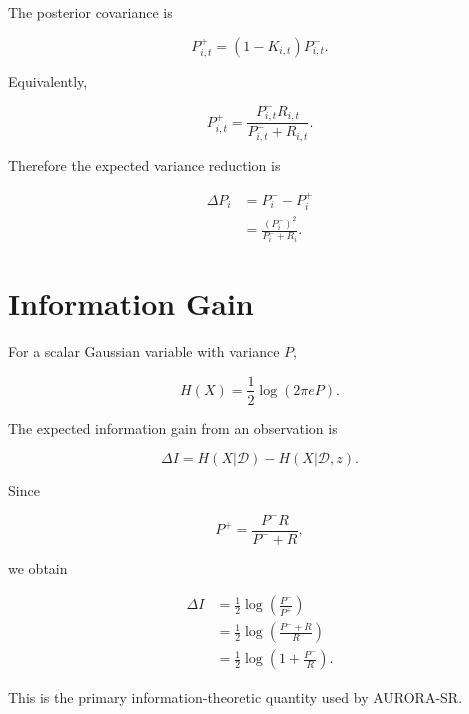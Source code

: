 \documentclass[11pt,a4paper]{article}
\begin{document}
The posterior covariance is

\begin{equation}
P_{i,t}^{+}
=
(1-K_{i,t})P_{i,t}^{-}.
\end{equation}

Equivalently,

\begin{equation}
\boxed{
P_{i,t}^{+}
=
\frac{
P_{i,t}^{-}R_{i,t}
}{
P_{i,t}^{-}+R_{i,t}
}.
}
\end{equation}

Therefore the expected variance reduction is

\begin{align}
\Delta P_i
&=
P_i^{-}-P_i^{+}\\
&=
\frac{
(P_i^{-})^2
}{
P_i^{-}+R_i
}.
\end{align}


\section{Information Gain}

For a scalar Gaussian variable with variance $P$,

\begin{equation}
H(X)
=
\frac12
\log(2\pi eP).
\end{equation}

The expected information gain from an observation is

\begin{equation}
\Delta I
=
H(X|\mathcal D)
-
H(X|\mathcal D,z).
\end{equation}

Since

\begin{equation}
P^+
=
\frac{P^-R}{P^-+R},
\end{equation}

we obtain

\begin{align}
\Delta I
&=
\frac12
\log
\left(
\frac{P^-}{P^+}
\right)\\
&=
\frac12
\log
\left(
\frac{P^-+R}{R}
\right)\\
&=
\boxed{
\frac12
\log
\left(
1+\frac{P^-}{R}
\right).
}
\end{align}

This is the primary information-theoretic quantity used by
AURORA-SR.
\end{document}
